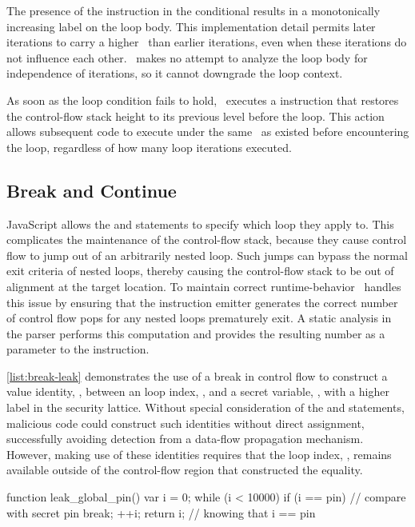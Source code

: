 The presence of the \join instruction in the conditional results in a monotonically increasing label on the loop body.
This implementation detail permits later iterations to carry a higher \pclabel\ than earlier iterations, even when these iterations do not influence each other.
\FlowCore\ makes no attempt to analyze the loop body for independence of iterations, so it cannot downgrade the loop context.

As soon as the loop condition fails to hold, \FlowCore\ executes a \popj instruction that restores the control-flow stack height to its previous level before the loop.
This action allows subsequent code to execute under the same \pclabel\ as existed before encountering the loop, regardless of how many loop iterations executed.

\subsection{Break and Continue}
\label{sec:break-and-continue}

JavaScript allows the  and  statements to specify which loop they apply to.
This complicates the maintenance of the control-flow stack, because they cause control flow to jump out of an arbitrarily nested loop.
Such jumps can bypass the normal exit criteria of nested loops, thereby causing the control-flow stack to be out of alignment at the target location.
To maintain correct runtime-behavior \FlowCore\ handles this issue by ensuring that the instruction emitter generates the correct number of control flow pops for any nested loops prematurely exit.
A static analysis in the parser performs this computation and provides the resulting number as a parameter to the \popj instruction.

\autoref{list:break-leak} demonstrates the use of a break in control flow to construct a value identity, , between an loop index, , and a secret variable, , with a higher label in the security lattice.
Without special consideration of the  and  statements, malicious code could construct such identities without direct assignment, successfully avoiding detection from a data-flow propagation mechanism.
However, making use of these identities requires that the loop index, , remains available outside of the control-flow region that constructed the equality.

\begin{jscode}
function leak_global_pin() {
  var i = 0;
  while (i < 10000) {
    if (i == pin) {   // compare with secret pin
      break;
    }
    ++i;
  }
  return i; // knowing that i == pin
}
\end{jscode}

